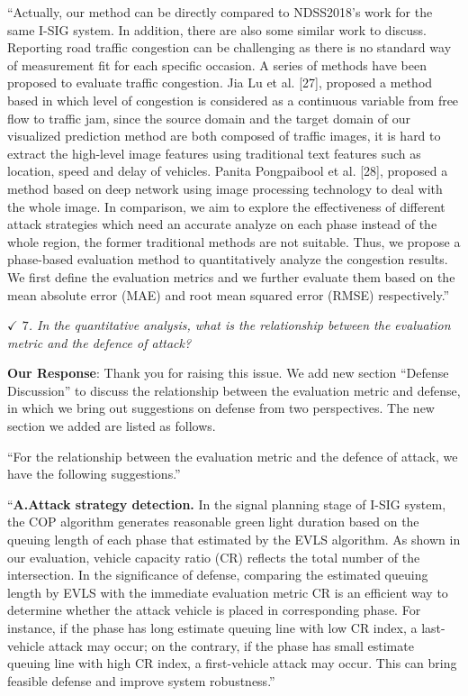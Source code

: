 \documentclass{amsart}
\theoremstyle{definition}
\theoremstyle{remark}
\numberwithin{equation}{section}
\begin{document}
``Actually, our method can be directly compared to NDSS2018's work for the same I-SIG system. In addition, there are also some similar work to discuss. Reporting road traffic congestion can be challenging as there is no standard way of measurement fit for each specific occasion. A series of methods have been proposed to evaluate traffic congestion. Jia Lu et al. [27], proposed a method based in which level of congestion is considered as a continuous variable from free flow to traffic jam, since the source domain and the target domain of our visualized prediction method are both composed of traffic images, it is hard to extract the high-level image features using traditional text features such as location, speed and delay of vehicles. Panita Pongpaibool et al. [28], proposed a method based on deep network using image processing technology to deal with the whole image. In comparison, we aim to explore the effectiveness of different attack strategies which need an accurate analyze on each phase instead of the whole region, the former traditional methods are not suitable. Thus, we propose a phase-based evaluation method to quantitatively analyze the congestion results. We first define the evaluation metrics and we further evaluate them based on the mean absolute error (MAE) and root mean squared error (RMSE) respectively.''


\emph{$\checkmark$ $7$. In the quantitative analysis, what is the relationship between the evaluation metric and the defence of attack?}

\textbf{Our Response}:
Thank you for raising this issue. We add new section ``Defense Discussion'' to discuss the relationship between the evaluation metric and defense, in which we bring out suggestions on defense from two perspectives. The new section we added are listed as follows.

``For the relationship between the evaluation metric and the defence of attack, we have the following suggestions.''

``\textbf{A.Attack strategy detection.} In the signal planning stage of I-SIG system, the COP algorithm generates reasonable green light duration based on the queuing length of each phase that estimated by the EVLS algorithm. As shown in our evaluation, vehicle capacity ratio (CR) reflects the total number of the intersection. In the significance of defense, comparing the estimated queuing length by EVLS with the immediate evaluation metric CR is an efficient way to determine whether the attack vehicle is placed in corresponding phase. For instance, if the phase has long estimate queuing line with low CR index, a last-vehicle attack may occur; on the contrary, if the phase has small estimate queuing line with high CR index, a first-vehicle attack may occur. This can bring feasible defense and improve system robustness.''
\end{document}
